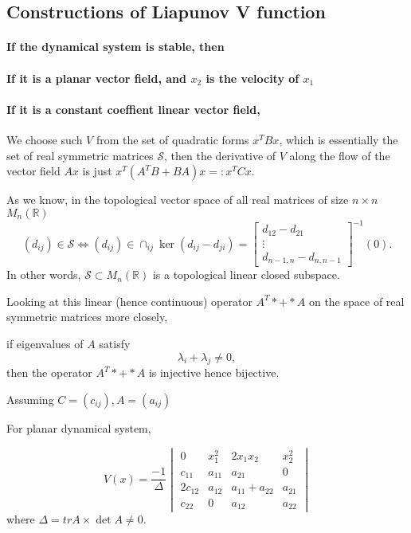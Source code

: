 \documentclass{tufte-handout}
\begin{document}
\subsection{Constructions of Liapunov V function}

\paragraph{If the dynamical system is stable, then }
\paragraph{If it is a planar vector field, and $x_2$ is the velocity of $x_1$}
\paragraph{If it is a constant coeffient linear vector field,}
We choose such $V$ from the set of quadratic forms ${x^T B x}$, which is essentially the set of real symmetric matrices $\mathscr{S}$, then the derivative of $V$ along the flow of the vector field ${Ax}$ is just $x^T (A^T B+ BA)x=: x^TCx$. 

As we know, in the topological vector space of all real matrices of size $n\times n$ $M_n(\mathbb{R})$ \[ (d_{ij})\in \mathscr{S} \iff (d_{ij}) \in \cap_{ij} \ker(d_{ij} - d_{ji}) =
\begin{bmatrix}
	d_{12} - d_{21} \\
	\vdots \\
	d_{n-1,n} - d_{n,n-1}
\end{bmatrix} 
^{-1}
(0).
\]
In other words, $\mathscr{S} \subset M_n(\mathbb{R})$ is a topological linear closed subspace.

Looking at this linear (hence continuous) operator $A^T * + * A$ on the space of real symmetric matrices more closely, 

\begin{lemma} if eigenvalues of $A$ satisfy \[ \lambda_i + \lambda_j \neq 0, \]
then the operator $A^T * + * A$ is injective hence bijective.
\end{lemma}
Assuming $C=(c_{ij}), A=(a_{ij})$

For planar dynamical system, 

\[ V(x)
=
\frac{-1}{\Delta}
\begin{vmatrix}
	0 &	x_1^2 & 2 x_1x_2 & x_2^2 \\
	c_{11} & a_{11} & a_{21} & 0 \\
	2c_{12} & a_{12} & a_{11} + a_{22} & a_{21} \\
	c_{22} & 0 & a_{12} & a_{22}
\end{vmatrix}
\]
where $\Delta = tr A \times \det A \neq 0.$



\end{document}
